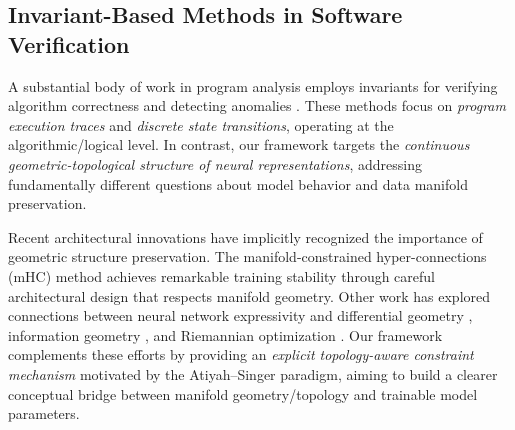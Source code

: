 \documentclass[10pt,leqno]{amsart}
\begin{document}
\subsection{Invariant-Based Methods in Software Verification}
A substantial body of work in program analysis employs invariants for verifying algorithm correctness and detecting anomalies \cite{ernst2001dynamically,ghezzi2008mining}. These methods focus on \emph{program execution traces} and \emph{discrete state transitions}, operating at the algorithmic/logical level. In contrast, our framework targets the \emph{continuous geometric-topological structure of neural representations}, addressing fundamentally different questions about model behavior and data manifold preservation.

Recent architectural innovations have implicitly recognized the importance of geometric structure preservation. The manifold-constrained hyper-connections (mHC) method \cite{deepseek2025mhc} achieves remarkable training stability through careful architectural design that respects manifold geometry. Other work has explored connections between neural network expressivity and differential geometry \cite{poole2016exponential}, information geometry \cite{amari2016information}, and Riemannian optimization \cite{bonnabel2013stochastic}. Our framework complements these efforts by providing an \emph{explicit topology-aware constraint mechanism} motivated by the Atiyah--Singer paradigm, aiming to build a clearer conceptual bridge between manifold geometry/topology and trainable model parameters.
\end{document}
